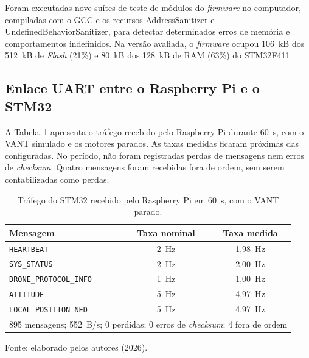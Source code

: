 Foram executadas nove suítes de teste de módulos do \textit{firmware} no computador, compiladas com o GCC e os recursos AddressSanitizer e UndefinedBehaviorSanitizer, para detectar determinados erros de memória e comportamentos indefinidos. Na versão avaliada, o \textit{firmware} ocupou 106~kB dos 512~kB de \textit{Flash} (21\%) e 80~kB dos 128~kB de RAM (63\%) do STM32F411.

\subsection{Enlace UART entre o Raspberry Pi e o STM32}\label{subsec:res_com_enlace}

A Tabela~\ref{tab:com_enlace} apresenta o tráfego recebido pelo Raspberry Pi durante 60~s, com o VANT simulado e os motores parados. As taxas medidas ficaram próximas das configuradas. No período, não foram registradas perdas de mensagens nem erros de \textit{checksum}. Quatro mensagens foram recebidas fora de ordem, sem serem contabilizadas como perdas.

\begin{table}[H]
    \centering
    \caption{Tráfego do STM32 recebido pelo Raspberry Pi em 60~s, com o VANT parado.}
    \label{tab:com_enlace}
    \small
    \renewcommand{\arraystretch}{1.2}
    \begin{tabular}{lcc}
        \hline
        \textbf{Mensagem} & \textbf{Taxa nominal} & \textbf{Taxa medida} \\
        \hline
        \texttt{HEARTBEAT} & 2~Hz & 1,98~Hz \\
        \texttt{SYS\_STATUS} & 2~Hz & 2,00~Hz \\
        \texttt{DRONE\_PROTOCOL\_INFO} & 1~Hz & 1,00~Hz \\
        \texttt{ATTITUDE} & 5~Hz & 4,97~Hz \\
        \texttt{LOCAL\_POSITION\_NED} & 5~Hz & 4,97~Hz \\
        \hline
        \multicolumn{3}{l}{895 mensagens; 552~B/s; 0 perdidas; 0 erros de \textit{checksum}; 4 fora de ordem} \\
        \hline
    \end{tabular}
    \par\vspace{0.2cm}
    \footnotesize Fonte: elaborado pelos autores (2026).
\end{table}

